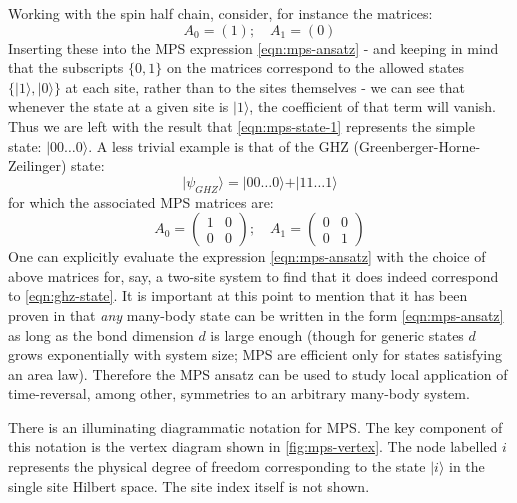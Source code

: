 \documentclass[preprint]{SciPost}
\newcommand{\ket}[1]{\vert #1 \rangle}
\theoremstyle{plain} %
\begin{document}
Working with the spin half chain, consider, for instance the matrices:
\begin{equation}\label{eqn:mps-state-1}
	A_0 = (1); \quad A_1 = (0)
\end{equation}
Inserting these into the MPS expression \eqref{eqn:mps-ansatz} - and keeping in mind that the subscripts $ \{0,1\} $ on the matrices correspond to the allowed states $ \{\ket{1}, \ket{0} \} $ at each site, rather than to the sites themselves - we can see that whenever the state at a given site is $ \ket{1} $, the coefficient of that term will vanish. Thus we are left with the result that \eqref{eqn:mps-state-1} represents the simple state: $ \ket{00\ldots0} $. A less trivial example is that of the GHZ (Greenberger-Horne-Zeilinger) \cite{Greenberger1990Bells} state:
\begin{equation}\label{eqn:ghz-state}
	\ket{\psi_{GHZ}} = \ket{00\ldots0} + \ket{11\ldots1}
\end{equation}
for which the associated MPS matrices are:
\begin{equation}\label{eqn:ghz-matrices}
	A_0 = \begin{pmatrix} 1 & 0 \\ 0 & 0 \end{pmatrix}; \quad A_1 = \begin{pmatrix} 0 & 0 \\ 0 & 1 \end{pmatrix}
\end{equation}
One can explicitly evaluate the expression \eqref{eqn:mps-ansatz} with the choice of above matrices for, say, a two-site system to find that it does indeed correspond to \eqref{eqn:ghz-state}. It is important at this point to mention that it has been proven in \cite{Vidal2004Efficient} that \emph{any} many-body state can be written in the form \eqref{eqn:mps-ansatz} as long as the bond dimension $ d $ is large enough (though for generic states $d$ grows exponentially with system size; MPS are efficient only for states satisfying an area law). Therefore the MPS ansatz can be used to study local application of time-reversal, among other, symmetries to an arbitrary many-body system.

There is an illuminating diagrammatic notation \cite{Bridgeman2016Hand-waving} for MPS. The key component of this notation is the vertex diagram shown in \autoref{fig:mps-vertex}. The node labelled $ i $ represents the physical degree of freedom corresponding to the state $ \ket{i} $ in the single site Hilbert space. The site index itself is not shown.
\end{document}
